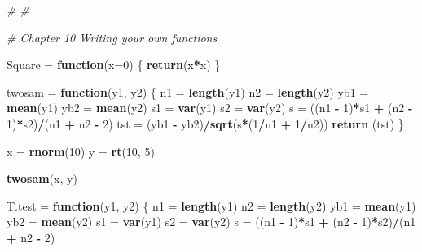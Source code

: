 \documentclass[10pt,]{krantz}
\makeatletter
\newenvironment{Shaded}{\begin{snugshade}}{\end{snugshade}}
\newcommand{\KeywordTok}[1]{\textcolor[rgb]{0.13,0.29,0.53}{\textbf{#1}}}
\newcommand{\DataTypeTok}[1]{\textcolor[rgb]{0.13,0.29,0.53}{#1}}
\newcommand{\DecValTok}[1]{\textcolor[rgb]{0.00,0.00,0.81}{#1}}
\newcommand{\StringTok}[1]{\textcolor[rgb]{0.31,0.60,0.02}{#1}}
\newcommand{\CommentTok}[1]{\textcolor[rgb]{0.56,0.35,0.01}{\textit{#1}}}
\newcommand{\ControlFlowTok}[1]{\textcolor[rgb]{0.13,0.29,0.53}{\textbf{#1}}}
\newcommand{\OperatorTok}[1]{\textcolor[rgb]{0.81,0.36,0.00}{\textbf{#1}}}
\newcommand{\NormalTok}[1]{#1}
\newenvironment{kframe}{%
\medskip{}
\setlength{\fboxsep}{.8em}
 \def\at@end@of@kframe{}%
 \ifinner\ifhmode%
  \def\at@end@of@kframe{\end{minipage}}%
  \begin{minipage}{\columnwidth}%
 \fi\fi%
 \def\FrameCommand##1{\hskip\@totalleftmargin \hskip-\fboxsep
 \colorbox{shadecolor}{##1}\hskip-\fboxsep
     \hskip-\linewidth \hskip-\@totalleftmargin \hskip\columnwidth}%
 \MakeFramed {\advance\hsize-\width
   \@totalleftmargin\z@ \linewidth\hsize
   \@setminipage}}%
 {\par\unskip\endMakeFramed%
 \at@end@of@kframe}
\renewenvironment{Shaded}{\begin{kframe}}{\end{kframe}}
\theoremstyle{definition}
\theoremstyle{definition}
\theoremstyle{remark}
\makeatother
\begin{document}
\begin{Shaded}
\begin{Highlighting}[]
   
\CommentTok{#}
\CommentTok{#}

\CommentTok{# Chapter 10 Writing your own functions}

\NormalTok{Square =}\StringTok{ }\ControlFlowTok{function}\NormalTok{(}\DataTypeTok{x=}\DecValTok{0}\NormalTok{)}
\NormalTok{\{}
  \KeywordTok{return}\NormalTok{(x}\OperatorTok{*}\NormalTok{x)}
\NormalTok{\}}

\NormalTok{twosam =}\StringTok{ }\ControlFlowTok{function}\NormalTok{(y1, y2) }
\NormalTok{\{}
\NormalTok{  n1  =}\StringTok{ }\KeywordTok{length}\NormalTok{(y1)}
\NormalTok{  n2  =}\StringTok{ }\KeywordTok{length}\NormalTok{(y2)}
\NormalTok{  yb1 =}\StringTok{ }\KeywordTok{mean}\NormalTok{(y1)}
\NormalTok{  yb2 =}\StringTok{ }\KeywordTok{mean}\NormalTok{(y2)}
\NormalTok{  s1  =}\StringTok{ }\KeywordTok{var}\NormalTok{(y1)}
\NormalTok{  s2  =}\StringTok{ }\KeywordTok{var}\NormalTok{(y2) }
\NormalTok{  s   =}\StringTok{ }\NormalTok{((n1 }\OperatorTok{-}\StringTok{ }\DecValTok{1}\NormalTok{)}\OperatorTok{*}\NormalTok{s1 }\OperatorTok{+}\StringTok{ }\NormalTok{(n2 }\OperatorTok{-}\StringTok{ }\DecValTok{1}\NormalTok{)}\OperatorTok{*}\NormalTok{s2)}\OperatorTok{/}\NormalTok{(n1 }\OperatorTok{+}\StringTok{ }\NormalTok{n2 }\OperatorTok{-}\StringTok{ }\DecValTok{2}\NormalTok{)}
\NormalTok{  tst =}\StringTok{ }\NormalTok{(yb1 }\OperatorTok{-}\StringTok{ }\NormalTok{yb2)}\OperatorTok{/}\KeywordTok{sqrt}\NormalTok{(s}\OperatorTok{*}\NormalTok{(}\DecValTok{1}\OperatorTok{/}\NormalTok{n1 }\OperatorTok{+}\StringTok{ }\DecValTok{1}\OperatorTok{/}\NormalTok{n2))}
  \KeywordTok{return}\NormalTok{ (tst)}
\NormalTok{\}}

\NormalTok{x =}\StringTok{ }\KeywordTok{rnorm}\NormalTok{(}\DecValTok{10}\NormalTok{)}
\NormalTok{y =}\StringTok{ }\KeywordTok{rt}\NormalTok{(}\DecValTok{10}\NormalTok{, }\DecValTok{5}\NormalTok{)}

\KeywordTok{twosam}\NormalTok{(x, y)}

\NormalTok{T.test =}\StringTok{ }\ControlFlowTok{function}\NormalTok{(y1, y2) }
\NormalTok{\{}
\NormalTok{  n1  =}\StringTok{ }\KeywordTok{length}\NormalTok{(y1)}
\NormalTok{  n2  =}\StringTok{ }\KeywordTok{length}\NormalTok{(y2)}
\NormalTok{  yb1 =}\StringTok{ }\KeywordTok{mean}\NormalTok{(y1)}
\NormalTok{  yb2 =}\StringTok{ }\KeywordTok{mean}\NormalTok{(y2)}
\NormalTok{  s1  =}\StringTok{ }\KeywordTok{var}\NormalTok{(y1)}
\NormalTok{  s2  =}\StringTok{ }\KeywordTok{var}\NormalTok{(y2) }
\NormalTok{  s   =}\StringTok{ }\NormalTok{((n1 }\OperatorTok{-}\StringTok{ }\DecValTok{1}\NormalTok{)}\OperatorTok{*}\NormalTok{s1 }\OperatorTok{+}\StringTok{ }\NormalTok{(n2 }\OperatorTok{-}\StringTok{ }\DecValTok{1}\NormalTok{)}\OperatorTok{*}\NormalTok{s2)}\OperatorTok{/}\NormalTok{(n1 }\OperatorTok{+}\StringTok{ }\NormalTok{n2 }\OperatorTok{-}\StringTok{ }\DecValTok{2}\NormalTok{)}


\end{Highlighting}
\end{Shaded}
\end{document}
